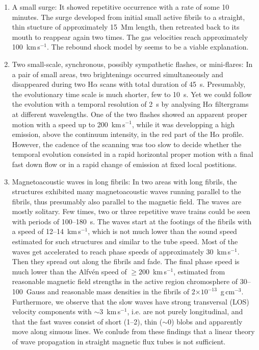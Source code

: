 \begin{enumerate} 
\item
A small surge: It showed repetitive occurrence with a rate of some 10 minutes. The surge developed from initial small active fibrils to a straight, thin stucture of approximately 15~Mm length, then retreated back to its mouth to reappear again two times. The gas velocities reach approximately 100~km\,s$^{-1}$. The rebound shock model by \citet{1989ApJ...343..985S} seems to be a viable explanation.
\item
Two small-scale, synchronous, possibly sympathetic flashes, or mini-flares: In
a pair of small areas, two brightenings occurred simultaneously and
disappeared during two H$\alpha$ scans with total duration of
45~s. Presumably, the evolutionary time scale is much shorter, few to
10~s. Yet we could follow the evolution with a temporal resolution of 2~s by analysing H$\alpha$ filtergrams at different wavelengths. One of the two flashes showed an apparent proper motion with a speed up to 200~km\,s$^{-1}$, while it was developping a high emission, above the continuum intensity, in the red part of the H$\alpha$ profile. However, the cadence of the scanning was too slow to decide whether the temporal evolution consisted in a rapid horizontal proper motion with a final fast down flow or in a rapid change of emission at fixed local postitions.
\item
Magnetoacoustic waves in long fibrils: In two areas with long fibrils, the structures exhibited many magnetoacoustic waves running parallel to the fibrils, thus presumably also parallel to the magnetic field. The waves are mostly solitary. Few times, two or three repetitive wave trains could be seen with periods of 100--180~s. The waves start at the footings of the fibrils with a speed of 12--14~km\,s$^{-1}$, which is not much lower than the sound speed estimated for such structures and similar to the tube speed. Most of the waves get accelerated to reach phase speeds of approximately 30~km\,s$^{-1}$. Then they spread out along the fibrils and fade. The final phase speed is much lower than the Alfv\'en speed of $\ge200$~km\,s$^{-1}$, estimated from reasonable magnetic field strengths in the active region chromosphere of 30--100~Gauss and reasonable mass densities in the fibrils of 2$\times10^{-13}$~g\,cm$^{-3}$. Furthermore, we observe that the slow waves have strong transversal (LOS) velocity components with $\sim$3~km\,s$^{-1}$, i.e. are not purely longitudinal, and that the fast waves consist of short (1\arcsec--2\arcsec), thin ($\sim$0) blobs and apparently move along sinuous lines. We conlude from these findings that a linear theory of wave propagation in straight magnetic flux tubes is not sufficient. 
\end{enumerate}
